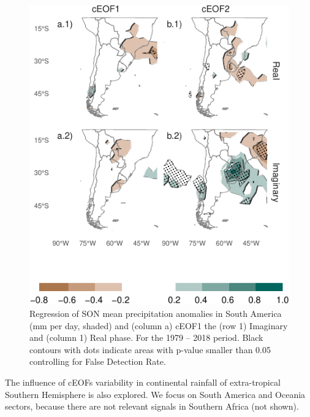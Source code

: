 \documentclass[smallextended]{svjour3}       %
\begin{document}
\begin{figure}
\centering
\includegraphics{../figures/pp-america-1.pdf}
\caption{\label{fig:pp-america}Regression of SON mean precipitation anomalies in South America (mm per day, shaded) and (column a) cEOF1 the (row 1) Imaginary and (column 1) Real phase. For the 1979 -- 2018 period. Black contours with dots indicate areas with p-value smaller than 0.05 controlling for False Detection Rate.}
\end{figure}

The influence of cEOFs variability in continental rainfall of extra-tropical Southern Hemisphere is also explored. We focus on South America and Oceania sectors, because there are not relevant signals in Southern Africa (not shown).
\end{document}
